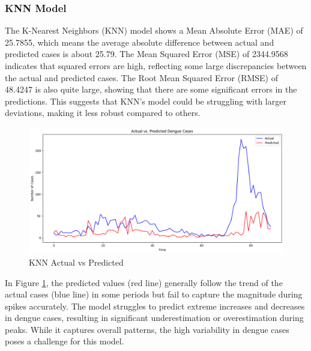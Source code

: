 \documentclass{article}
\begin{document}
\subsubsection{KNN Model}
The K-Nearest Neighbors (KNN) model shows a Mean Absolute Error (MAE) of 25.7855, which means the average absolute difference between actual and predicted cases is about 25.79. The Mean Squared Error (MSE) of 2344.9568 indicates that squared errors are high, reflecting some large discrepancies between the actual and predicted cases. The Root Mean Squared Error (RMSE) of 48.4247 is also quite large, showing that there are some significant errors in the predictions. This suggests that KNN's model could be struggling with larger deviations, making it less robust compared to others.
\begin{figure}[h!]
    \centering
    \includegraphics[width=1\linewidth]{image/knn plot.png}
    \caption{KNN Actual vs Predicted}
    \label{fig:knn}
\end{figure}

In Figure \ref{fig:knn}, the predicted values (red line) generally follow the trend of the actual cases (blue line) in some periods but fail to capture the magnitude during spikes accurately. The model struggles to predict extreme increases and decreases in dengue cases, resulting in significant underestimation or overestimation during peaks. While it captures overall patterns, the high variability in dengue cases poses a challenge for this model.
\end{document}
